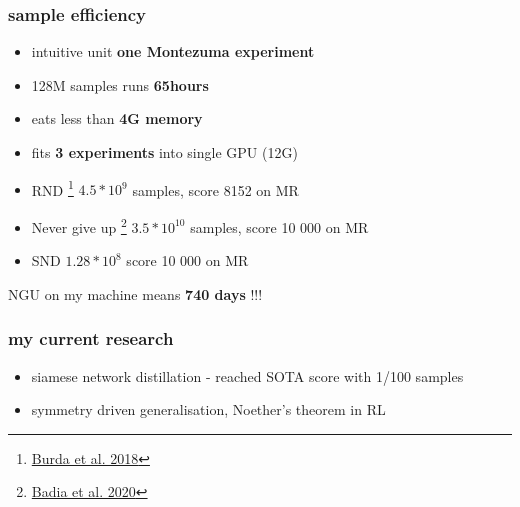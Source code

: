 \documentclass{beamer}
\begin{document}
\begin{frame}
  
  \frametitle{sample efficiency}

  \begin{itemize}
    \item intuitive unit {\bf one Montezuma experiment}
    \item 128M samples runs {\bf 65hours}
    \item eats less than {\bf 4G memory}
    \item fits {\bf 3 experiments} into single GPU (12G)
  \end{itemize}

  \bigskip

  \begin{itemize}
    \item RND \footnote{\href{https://arxiv.org/pdf/1810.12894.pdf}{Burda et al. 2018}} $4.5*10^9$ samples, score 8152 on MR
    \item Never give up \footnote{\href{https://arxiv.org/pdf/2002.06038.pdf}{Badia et al. 2020}} $3.5*10^{10}$ samples, score 10 000 on MR
    \item SND $1.28*10^8$ score 10 000 on MR 
  \end{itemize}

  NGU on my machine means {\bf 740 days} !!!
\end{frame}


\begin{frame}
  
  \frametitle{my current research}

    \begin{itemize}
      \item siamese network distillation - reached SOTA score with 1/100 samples
      \item symmetry driven generalisation, Noether's theorem in RL
    \end{itemize}

\end{frame}
\end{document}
